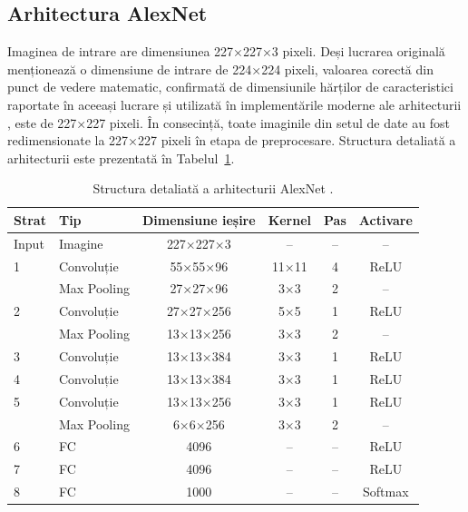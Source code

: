 \subsection{Arhitectura AlexNet}

Imaginea de intrare are dimensiunea 227×227×3 pixeli. Deși  lucrarea originală \cite{krizhevsky2012imagenet} menționează o dimensiune de intrare de 224×224 pixeli, valoarea corectă din punct de vedere matematic, confirmată de dimensiunile hărților de caracteristici raportate în aceeași lucrare și utilizată în implementările moderne ale arhitecturii \cite{suh2018alexnet}, este de 227×227 pixeli. În consecință, toate imaginile din setul de date au fost redimensionate la 227×227 pixeli în etapa de preprocesare. Structura detaliată a arhitecturii este prezentată în Tabelul~\ref{tab:alexnet}.

\begin{table}[H]
\centering
\caption{Structura detaliată a arhitecturii AlexNet
\cite{krizhevsky2012imagenet}.}
\label{tab:alexnet}
\begin{tabular}{llcccc}
\hline
\textbf{Strat} & \textbf{Tip} & \textbf{Dimensiune ieșire} &
\textbf{Kernel} & \textbf{Pas} & \textbf{Activare} \\
\hline
Input   & Imagine      & 227×227×3   & --    & -- & --      \\
\hline
1       & Convoluție   & 55×55×96    & 11×11 & 4  & ReLU    \\
        & Max Pooling  & 27×27×96    & 3×3   & 2  & --      \\
\hline
2       & Convoluție   & 27×27×256   & 5×5   & 1  & ReLU    \\
        & Max Pooling  & 13×13×256   & 3×3   & 2  & --      \\
\hline
3       & Convoluție   & 13×13×384   & 3×3   & 1  & ReLU    \\
\hline
4       & Convoluție   & 13×13×384   & 3×3   & 1  & ReLU    \\
\hline
5       & Convoluție   & 13×13×256   & 3×3   & 1  & ReLU    \\
        & Max Pooling  & 6×6×256     & 3×3   & 2  & --      \\
\hline
6       & FC           & 4096        & --    & -- & ReLU    \\
7       & FC           & 4096        & --    & -- & ReLU    \\
8       & FC           & 1000        & --    & -- & Softmax \\
\hline
\end{tabular}
\end{table}





